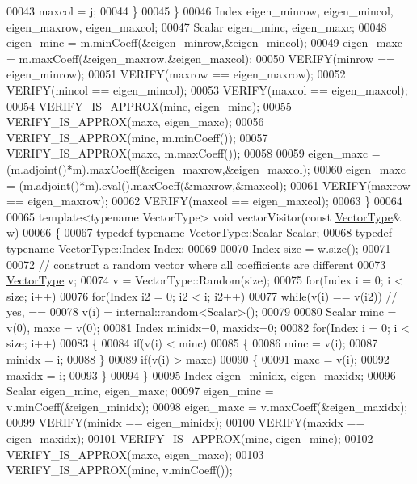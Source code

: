 \begin{DoxyCode}
00043       maxcol = j;
00044     \}
00045   \}
00046   Index eigen\_minrow, eigen\_mincol, eigen\_maxrow, eigen\_maxcol;
00047   Scalar eigen\_minc, eigen\_maxc;
00048   eigen\_minc = m.minCoeff(&eigen\_minrow,&eigen\_mincol);
00049   eigen\_maxc = m.maxCoeff(&eigen\_maxrow,&eigen\_maxcol);
00050   VERIFY(minrow == eigen\_minrow);
00051   VERIFY(maxrow == eigen\_maxrow);
00052   VERIFY(mincol == eigen\_mincol);
00053   VERIFY(maxcol == eigen\_maxcol);
00054   VERIFY\_IS\_APPROX(minc, eigen\_minc);
00055   VERIFY\_IS\_APPROX(maxc, eigen\_maxc);
00056   VERIFY\_IS\_APPROX(minc, m.minCoeff());
00057   VERIFY\_IS\_APPROX(maxc, m.maxCoeff());
00058 
00059   eigen\_maxc = (m.adjoint()*m).maxCoeff(&eigen\_maxrow,&eigen\_maxcol);
00060   eigen\_maxc = (m.adjoint()*m).eval().maxCoeff(&maxrow,&maxcol);
00061   VERIFY(maxrow == eigen\_maxrow);
00062   VERIFY(maxcol == eigen\_maxcol);
00063 \}
00064 
00065 \textcolor{keyword}{template}<\textcolor{keyword}{typename} VectorType> \textcolor{keywordtype}{void} vectorVisitor(\textcolor{keyword}{const} \hyperlink{struct_vector_type}{VectorType}& w)
00066 \{
00067   \textcolor{keyword}{typedef} \textcolor{keyword}{typename} VectorType::Scalar Scalar;
00068   \textcolor{keyword}{typedef} \textcolor{keyword}{typename} VectorType::Index Index;
00069 
00070   Index size = w.size();
00071 
00072   \textcolor{comment}{// construct a random vector where all coefficients are different}
00073   \hyperlink{struct_vector_type}{VectorType} v;
00074   v = VectorType::Random(size);
00075   \textcolor{keywordflow}{for}(Index i = 0; i < size; i++)
00076     \textcolor{keywordflow}{for}(Index i2 = 0; i2 < i; i2++)
00077       \textcolor{keywordflow}{while}(v(i) == v(i2)) \textcolor{comment}{// yes, ==}
00078         v(i) = internal::random<Scalar>();
00079   
00080   Scalar minc = v(0), maxc = v(0);
00081   Index minidx=0, maxidx=0;
00082   \textcolor{keywordflow}{for}(Index i = 0; i < size; i++)
00083   \{
00084     \textcolor{keywordflow}{if}(v(i) < minc)
00085     \{
00086       minc = v(i);
00087       minidx = i;
00088     \}
00089     \textcolor{keywordflow}{if}(v(i) > maxc)
00090     \{
00091       maxc = v(i);
00092       maxidx = i;
00093     \}
00094   \}
00095   Index eigen\_minidx, eigen\_maxidx;
00096   Scalar eigen\_minc, eigen\_maxc;
00097   eigen\_minc = v.minCoeff(&eigen\_minidx);
00098   eigen\_maxc = v.maxCoeff(&eigen\_maxidx);
00099   VERIFY(minidx == eigen\_minidx);
00100   VERIFY(maxidx == eigen\_maxidx);
00101   VERIFY\_IS\_APPROX(minc, eigen\_minc);
00102   VERIFY\_IS\_APPROX(maxc, eigen\_maxc);
00103   VERIFY\_IS\_APPROX(minc, v.minCoeff());

\end{DoxyCode}
